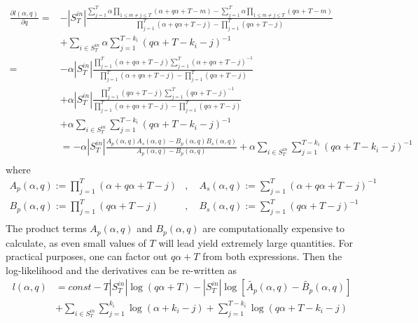 \documentclass[a4paper, 12pt]{article}
\newcommand{\sint}[1][T]{|S^{in}_{#1}|}
\begin{document}
\begin{align} \label{eq:6}
    \frac{\partial l(\alpha, q)}{\partial q} =& -\sint \frac{\sum_{j = 1}^{T} \alpha \prod_{1 \leq m \neq j \leq T} (\alpha + q\alpha + T - m) - \sum_{j = 1}^{T} \alpha \prod_{1 \leq m \neq j \leq T} (q\alpha + T - m)}{\prod_{j = 1}^{T} (\alpha + q\alpha + T - j) - \prod_{j=1}^T (q\alpha + T - j)}\nonumber \\
    &+ \sum_{i \in S_T^{in}} \alpha \sum_{j = 1}^{T - k_i} (q\alpha + T - k_i - j)^{-1} \nonumber \\
    =& -\alpha\sint \frac{ \prod_{j = 1}^{T} (\alpha + q\alpha + T - j) \sum_{j = 1}^{T} (\alpha + q\alpha + T - j)^{-1} }{\prod_{j = 1}^{T} (\alpha + q\alpha + T - j) - \prod_{j=1}^T (q\alpha + T - j)} \nonumber \\
    &+ \alpha|S_T^{in}| \frac{\prod_{j = 1}^{T} (q\alpha + T - j) \sum_{j = 1}^{T} (q\alpha + T - j)^{-1}  }{ \prod_{j = 1}^{T} (\alpha + q\alpha + T - j) - \prod_{j=1}^T (q\alpha + T - j)} \nonumber \\
    &+ \alpha \sum_{i \in S_T^{in}} \sum_{j = 1}^{T - k_i} (q\alpha + T - k_i - j)^{-1} \nonumber \\
    &= -\alpha \sint \frac{ A_p(\alpha, q) A_s(\alpha, q) - B_p(\alpha, q) B_s(\alpha, q)  }{ A_p(\alpha, q) - B_p(\alpha, q)} + \alpha \sum_{i \in S_T^{in}} \sum_{j = 1}^{T - k_i} (q\alpha + T - k_i - j)^{-1} \nonumber \\
\end{align}
where
\begin{align*}
A_p(\alpha, q) := \prod_{j = 1}^{T} (\alpha + q\alpha + T - j) &,\quad A_s(\alpha, q) := \sum_{j = 1}^{T} (\alpha + q\alpha + T - j)^{-1} \\
B_p(\alpha, q) := \prod_{j = 1}^{T} (q\alpha + T - j) &,\quad B_s(\alpha, q) := \sum_{j = 1}^{T} (q\alpha + T - j)^{-1} \\
\end{align*}
The product terms $A_p(\alpha, q)$ and $B_p(\alpha, q)$ are computationally expensive to calculate, as even small values of $T$ will lead yield extremely large quantities. For practical purposes, one can factor out $q\alpha + T$ from both expressions. Then the log-likelihood and the derivatives can be re-written as
\begin{align*}
    l(\alpha, q) &= const - T|S_T^{in}| \log(q\alpha + T) - \sint \log\left[ \widetilde{A_p}(\alpha, q) - \widetilde{B_p}(\alpha, q) \right] \nonumber \\
    &+ \sum_{i \in S_T^{in}} \sum_{j = 1}^{k_i} \log(\alpha + k_i - j) + \sum_{j = 1}^{T - k_i} \log(q\alpha + T - k_i - j) \nonumber \\
\end{align*}
\end{document}
